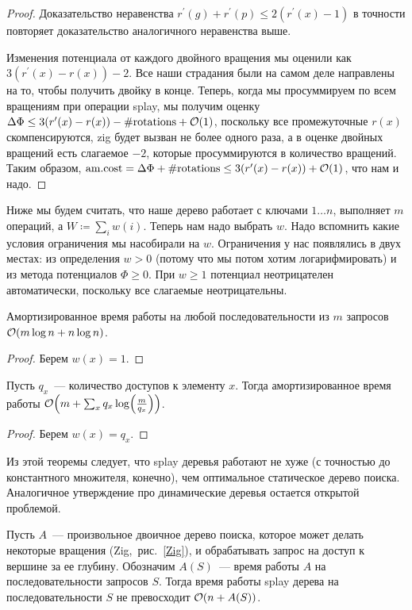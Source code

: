 \begin{proof}
    Доказательство неравенства $r^\prime(g) + r^\prime(p) \leq 2(r^\prime(x) - 1)$ в точности повторяет доказательство аналогичного неравенства выше.

    Изменения потенциала от каждого двойного вращения мы оценили как $3(r^\prime(x) - r(x)) - 2$. Все наши страдания были на самом деле направлены на то, чтобы получить двойку в конце. Теперь, когда мы просуммируем по всем вращениям при операции splay, мы получим оценку $\Delta\Phi \leq 3(r^\prime(x) - r(x)) - \#\text{rotations} + \mathcal{O}(1)$, поскольку все промежуточные $r(x)$ скомпенсируются, zig будет вызван не более одного раза, а в оценке двойных вращений есть слагаемое $-2$, которые просуммируются в количество вращений. Таким образом, $\text{am.cost} = \Delta\Phi + \#\text{rotations} \leq 3(r^\prime(x) - r(x)) + \mathcal{O}(1)$, что нам и надо.
\end{proof}

Ниже мы будем считать, что наше дерево работает с ключами $1 \ldots n$, выполняет $m$ операций, а $W \coloneqq \sum_i w(i)$. Теперь нам надо выбрать $w$. Надо вспомнить какие условия ограничения мы насобирали на $w$. Ограничения у нас появлялись в двух местах: из определения $w > 0$ (потому что мы потом хотим логарифмировать) и из метода потенциалов $\Phi \geq 0$. При $w \geq 1$ потенциал неотрицателен автоматически, поскольку все слагаемые неотрицательны.

\begin{corollary}
    Амортизированное время работы на любой последовательности из $m$ запросов $\BigO \parens*{m \log n + n \log n}$.
\end{corollary}
\begin{proof}
    Берем $w(x) = 1$.
\end{proof}

\begin{corollary}
    Пусть $q_x$~--- количество доступов к элементу $x$. Тогда амортизированное время работы $\BigO \parens*{m + \sum_x q_x \log \parens*{\frac{m}{q_x}}}$.
\end{corollary}
\begin{proof}
    Берем $w(x) = q_x$.
\end{proof}

Из этой теоремы следует, что splay деревья работают не хуже (с точностью до константного множителя, конечно), чем оптимальное статическое дерево поиска. Аналогичное утверждение про динамические деревья остается открытой проблемой.
	
\begin{conjecture}
	Пусть $A$~--- произвольное двоичное дерево поиска, которое может делать некоторые вращения (Zig,~рис.~\ref{Zig}), и обрабатывать запрос на доступ к вершине за ее глубину. Обозначим $A(S)$~--- время работы $A$ на последовательности запросов $S$. Тогда время работы splay дерева на последовательности $S$ не превосходит $\BigO \parens*{n + A(S)}$.
\end{conjecture}

